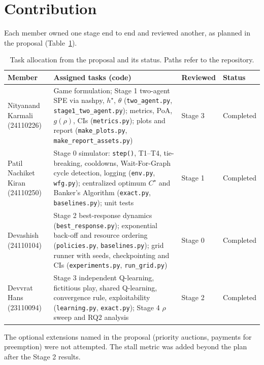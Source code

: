 \documentclass[10pt]{article}
\begin{document}
\section{Contribution}\label{sec:contrib}
Each member owned one stage end to end and reviewed another, as planned in the proposal (Table~\ref{tab:contrib}).
\begin{table}[!htbp]
\centering\small
\caption{Task allocation from the proposal and its status. Paths refer to the repository.}
\label{tab:contrib}
\begin{tabular}{p{2.6cm}p{8.6cm}p{1.6cm}p{1.8cm}}
\toprule
Member & Assigned tasks (code) & Reviewed & Status\\
\midrule
Nityanand Karmali (24110226) & Game formulation; Stage 1 two-agent SPE via nashpy, $h^\star$, $\theta$
(\texttt{two\_agent.py}, \texttt{stage1\_two\_agent.py}); metrics, PoA, $g(\rho)$, CIs (\texttt{metrics.py});
plots and report (\texttt{make\_plots.py}, \texttt{make\_report\_assets.py}) & Stage 3 & Completed \\
Patil Nachiket Kiran (24110250) & Stage 0 simulator: \texttt{step()}, T1--T4, tie-breaking, cooldowns, Wait-For-Graph cycle
detection, logging (\texttt{env.py}, \texttt{wfg.py}); centralized optimum $C^\star$ and Banker's Algorithm
(\texttt{exact.py}, \texttt{baselines.py}); unit tests & Stage 1 & Completed \\
Devashish (24110104) & Stage 2 best-response dynamics (\texttt{best\_response.py}); exponential back-off and resource
ordering (\texttt{policies.py}, \texttt{baselines.py}); grid runner with seeds, checkpointing and CIs
(\texttt{experiments.py}, \texttt{run\_grid.py}) & Stage 0 & Completed \\
Devvrat Hans (23110094) & Stage 3 independent Q-learning, fictitious play, shared Q-learning, convergence rule,
exploitability (\texttt{learning.py}, \texttt{exact.py}); Stage 4 $\rho$ sweep and RQ2 analysis & Stage 2 & Completed \\
\bottomrule
\end{tabular}
\end{table}

\noindent The optional extensions named in the proposal (priority auctions, payments for preemption) were not attempted.
The stall metric was added beyond the plan after the Stage 2 results.
\end{document}
